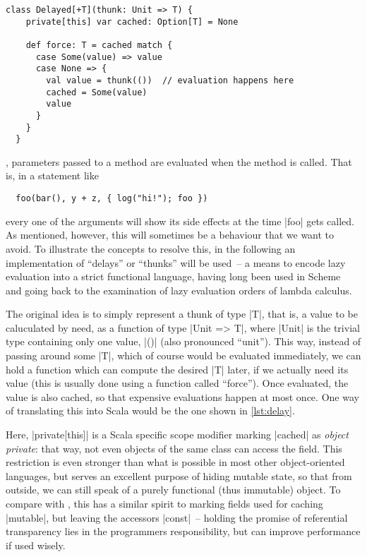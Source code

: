 \begin{lstlisting}[style=floating,floatplacement=t,
  caption={Scheme-inspired \lstinline|Delayed| implementation, using a function from
    \lstinline|Unit| and and a mutable variable for
    caching.\hfill\github{dsl-examples/blob/master/src/main/scala/dsl_examples/delay/Delay1.scala}},
  label=lst:delay]
  class Delayed[+T](thunk: Unit => T) { 
    private[this] var cached: Option[T] = None

    def force: T = cached match {
      case Some(value) => value
      case None => {
        val value = thunk(())  // evaluation happens here
        cached = Some(value)
        value
      }
    }
  }
\end{lstlisting}

, parameters passed to a method are evaluated when the
method is called. That is, in a statement like
\begin{lstlisting}
  foo(bar(), y + z, { log("hi!"); foo })
\end{lstlisting}
every one of the arguments will show its side effects at the time |foo| gets called. As mentioned,
however, this will sometimes be a behaviour that we want to avoid. To illustrate the concepts to
resolve this, in the following an implementation of \enquote{delays} or \enquote{thunks} will be
used~-- a means to encode lazy evaluation into a strict functional language, having long been used
in Scheme~\cite[][Chapter~4.2]{abelson1996:structure} and going back to the examination of lazy
evaluation orders of lambda calculus.

The original idea is to simply represent a thunk of type |T|, that is, a value to be caluculated by
need, as a function of type |Unit => T|, where |Unit| is the trivial type containing only one value,
|()| (also pronounced \enquote{unit}). This way, instead of passing around some |T|, which of course
would be evaluated immediately, we can hold a function which can compute the desired |T| later, if
we actually need its value (this is usually done using a function called \enquote{force}). Once
evaluated, the value is also cached, so that expensive evaluations happen at most once. One way of
translating this into Scala would be the one shown in \autoref{lst:delay}.

Here, |private[this]| is a Scala specific scope modifier marking |cached| as \emph{object private}:
that way, not even objects of the same class can access the field. This restriction is even stronger
than what is possible in most other object-oriented languages, but serves an excellent purpose of
hiding mutable state, so that from outside, we can still speak of a purely functional (thus
immutable) object. To compare with \CC{}, this has a similar spirit to marking fields used for
caching |mutable|, but leaving the accessors |const|~-- holding the promise of referential
transparency lies in the programmers responsibility, but can improve performance if used wisely.

